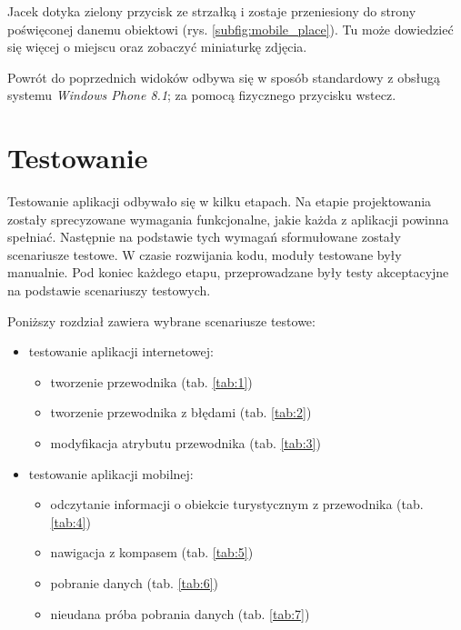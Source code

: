 \documentclass[a4paper]{book}
\begin{document}
		Jacek dotyka zielony przycisk ze strzałką i zostaje przeniesiony do strony poświęconej danemu obiektowi (rys. \ref{subfig:mobile_place}). Tu może dowiedzieć się więcej o miejscu oraz zobaczyć miniaturkę zdjęcia.
		
		Powrót do poprzednich widoków odbywa się w sposób standardowy z obsługą systemu \emph{Windows Phone 8.1}; za pomocą fizycznego przycisku wstecz. 		 
	
	\chapter{Testowanie}

	\label{id:cha:testowanie}
	
	Testowanie aplikacji odbywało się w kilku etapach. Na etapie projektowania zostały sprecyzowane wymagania funkcjonalne, jakie każda z aplikacji powinna spełniać. Następnie na podstawie tych wymagań sformułowane zostały scenariusze testowe. W czasie rozwijania kodu, moduły testowane były manualnie. Pod koniec każdego etapu, przeprowadzane były testy akceptacyjne na podstawie scenariuszy testowych. 
	 
	Poniższy rozdział zawiera wybrane scenariusze testowe:

	\begin{itemize}
	\item testowanie aplikacji internetowej:
	   \begin{itemize}
	   \item tworzenie przewodnika (tab. \ref{tab:1})
	   \item tworzenie przewodnika z błędami (tab. \ref{tab:2})
	   \item modyfikacja atrybutu przewodnika (tab. \ref{tab:3})
	   \end{itemize}
	\item testowanie aplikacji mobilnej:
	   \begin{itemize}
	   \item odczytanie informacji o obiekcie turystycznym z przewodnika (tab. \ref{tab:4})
	   \item nawigacja z kompasem  (tab. \ref{tab:5})
	   \item pobranie danych  (tab. \ref{tab:6})
	   \item nieudana próba pobrania danych  (tab. \ref{tab:7})
	   \end{itemize}
	\end{itemize}
	
	\setlength{\tabcolsep}{6pt}
	\renewcommand{\arraystretch}{1.5}
				
\end{document}
